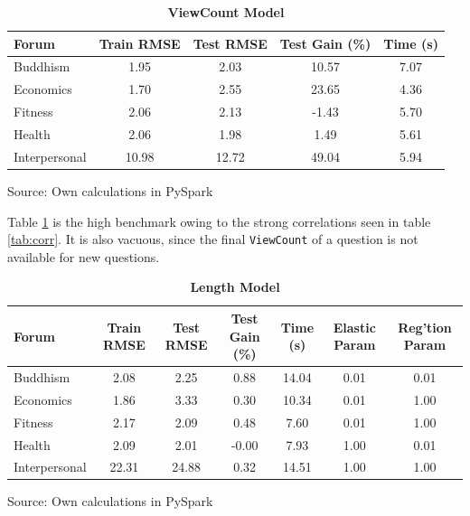 \documentclass[11pt,preprint, authoryear]{article}
\numberwithin{equation}{section}
\begin{document}
\begin{longtable}[htbp] {@{} lcccc @{}} 
\caption{\textbf{ViewCount Model}} 
\label{tab:rand_view_model} \\
\toprule
\textbf{Forum} &  \textbf{Train RMSE} &  \textbf{Test RMSE} &  \textbf{Test Gain (\%)} &  \textbf{Time (s)} \\
\midrule
Buddhism      &                 1.95 &              2.03 &              10.57 &               7.07 \\
Economics     &                 1.70 &              2.55 &              23.65 &               4.36 \\
Fitness       &                 2.06 &              2.13 &              -1.43 &               5.70 \\
Health        &                 2.06 &              1.98 &               1.49 &               5.61 \\
Interpersonal &                10.98 &             12.72 &              49.04 &               5.94 \\
\bottomrule
\end{longtable}\begin{center} Source: Own calculations in PySpark\end{center}

\normalsize

Table \ref{tab:rand_view_model} is the high benchmark owing to the
strong correlations seen in table \ref{tab:corr}. It is also vacuous,
since the final \texttt{ViewCount} of a question is not available for
new questions.

\footnotesize

\begin{longtable}[htbp] {@{} lcccccc @{}} 
\caption{\textbf{Length Model}} 
\label{tab:rand_count_model} \\
\toprule
\textbf{Forum} &  \textbf{Train RMSE} &  \textbf{Test RMSE} &  \textbf{Test Gain (\%)} &  \textbf{Time (s)} & \textbf{Elastic Param} &  \textbf{Reg'tion Param} \\
\midrule
Buddhism      &              2.08 &           2.25 &            0.88 &           14.04 &              0.01 &              0.01 \\
Economics     &              1.86 &           3.33 &            0.30 &           10.34 &              0.01 &              1.00 \\
Fitness       &              2.17 &           2.09 &            0.48 &            7.60 &              0.01 &              1.00 \\
Health        &              2.09 &           2.01 &           -0.00 &            7.93 &              1.00 &              0.01 \\
Interpersonal &             22.31 &          24.88 &            0.32 &           14.51 &              1.00 &              1.00 \\
\bottomrule
\end{longtable}\begin{center} Source: Own calculations in PySpark\end{center}
\end{document}
